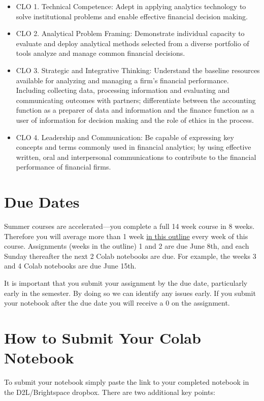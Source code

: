 \documentclass[11pt]{article}
\begin{document}
\begin{itemize}
\item CLO 1. Technical Competence: Adept in applying analytics technology to solve institutional problems and enable effective financial decision making.
\item CLO 2. Analytical Problem Framing: Demonstrate individual capacity to evaluate and deploy analytical methods selected from a diverse portfolio of tools analyze and manage common financial decisions.
\item CLO 3. Strategic and Integrative Thinking: Understand the baseline resources available for analyzing and managing a firm’s financial performance. Including collecting data, processing information and evaluating and communicating outcomes with partners; differentiate between the accounting function as a preparer of data and information and the finance function as a user of information for decision making and the role of ethics in the process.
\item CLO 4. Leadership and Communication: Be capable of expressing key concepts and terms commonly used in financial analytics; by using effective written, oral and interpersonal communications to contribute to the financial performance of financial firms.
\end{itemize}
\section{Due Dates}
\label{sec:org8fab060}


Summer courses are accelerated---you complete a full 14 week course in 8 weeks.  Therefore you will average more than 1 week \href{https://financial-education.github.io/python\_for\_finance\_outline/}{in this outline} every week of this course.  Assignments (weeks in the outline) 1 and 2 are due June 8th, and each Sunday thereafter the next 2 Colab notebooks are due.  For example, the weeks 3 and 4 Colab notebooks are due June 15th.

It is important that you submit your assignment by the due date, particularly early in the semester.  By doing so we can identify any issues early.  If you submit your notebook after the due date you will receive a 0 on the assignment.
\section{How to Submit Your Colab Notebook}
\label{sec:org5ded0db}

To submit your notebook simply paste the link to your completed notebook in the D2L/Brightspace dropbox.  There are two additional key points:
\end{document}

